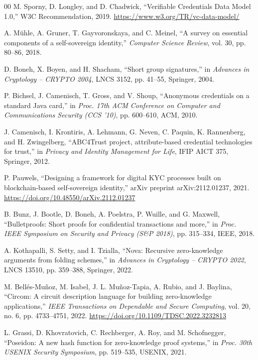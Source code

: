 \documentclass[conference]{IEEEtran}
\begin{document}
\begin{thebibliography}{00}
M. Sporny, D. Longley, and D. Chadwick, ``Verifiable Credentials Data Model 1.0,'' W3C Recommendation, 2019. \url{https://www.w3.org/TR/vc-data-model/}

A. M\"{u}hle, A. Gruner, T. Gayvoronskaya, and C. Meinel, ``A survey on essential components of a self-sovereign identity,'' \textit{Computer Science Review}, vol. 30, pp. 80--86, 2018.

D. Boneh, X. Boyen, and H. Shacham, ``Short group signatures,'' in \textit{Advances in Cryptology -- CRYPTO 2004}, LNCS 3152, pp. 41--55, Springer, 2004.

P. Bichsel, J. Camenisch, T. Gross, and V. Shoup, ``Anonymous credentials on a standard Java card,'' in \textit{Proc. 17th ACM Conference on Computer and Communications Security (CCS '10)}, pp. 600--610, ACM, 2010.

J. Camenisch, I. Krontiris, A. Lehmann, G. Neven, C. Paquin, K. Rannenberg, and H. Zwingelberg, ``ABC4Trust project, attribute-based credential technologies for trust,'' in \textit{Privacy and Identity Management for Life}, IFIP AICT 375, Springer, 2012.

P. Pauwels, ``Designing a framework for digital KYC processes built on blockchain-based self-sovereign identity,'' arXiv preprint arXiv:2112.01237, 2021. \url{https://doi.org/10.48550/arXiv.2112.01237}

B. Bunz, J. Bootle, D. Boneh, A. Poelstra, P. Wuille, and G. Maxwell, ``Bulletproofs: Short proofs for confidential transactions and more,'' in \textit{Proc. IEEE Symposium on Security and Privacy (S\&P 2018)}, pp. 315--334, IEEE, 2018.

A. Kothapalli, S. Setty, and I. Tzialla, ``Nova: Recursive zero-knowledge arguments from folding schemes,'' in \textit{Advances in Cryptology -- CRYPTO 2022}, LNCS 13510, pp. 359--388, Springer, 2022.

M. Bell\'{e}s-Mu\~{n}oz, M. Isabel, J. L. Mu\~{n}oz-Tapia, A. Rubio, and J. Baylina, ``Circom: A circuit description language for building zero-knowledge applications,'' \textit{IEEE Transactions on Dependable and Secure Computing}, vol. 20, no. 6, pp. 4733--4751, 2022. \url{https://doi.org/10.1109/TDSC.2022.3232813}

L. Grassi, D. Khovratovich, C. Rechberger, A. Roy, and M. Schofnegger, ``Poseidon: A new hash function for zero-knowledge proof systems,'' in \textit{Proc. 30th USENIX Security Symposium}, pp. 519--535, USENIX, 2021.


\end{thebibliography}
\end{document}
